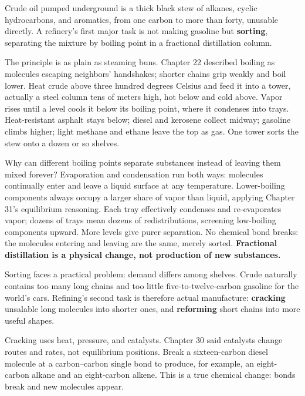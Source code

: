 Crude oil pumped underground is a thick black stew of alkanes, cyclic hydrocarbons, and aromatics, from one carbon to more than forty, unusable directly. A refinery's first major task is not making gasoline but \textbf{sorting}, separating the mixture by boiling point in a fractional distillation column.

The principle is as plain as steaming buns. Chapter 22 described boiling as molecules escaping neighbors' handshakes; shorter chains grip weakly and boil lower. Heat crude above three hundred degrees Celsius and feed it into a tower, actually a steel column tens of meters high, hot below and cold above. Vapor rises until a level cools it below its boiling point, where it condenses into trays. Heat-resistant asphalt stays below; diesel and kerosene collect midway; gasoline climbs higher; light methane and ethane leave the top as gas. One tower sorts the stew onto a dozen or so shelves.

\begin{qiaoliang}
Why can different boiling points separate substances instead of leaving them mixed forever? Evaporation and condensation run both ways: molecules continually enter and leave a liquid surface at any temperature. Lower-boiling components always occupy a larger share of vapor than liquid, applying Chapter 31's equilibrium reasoning. Each tray effectively condenses and re-evaporates vapor; dozens of trays mean dozens of redistributions, screening low-boiling components upward. More levels give purer separation. No chemical bond breaks: the molecules entering and leaving are the same, merely sorted. \textbf{Fractional distillation is a physical change, not production of new substances.}
\end{qiaoliang}

Sorting faces a practical problem: demand differs among shelves. Crude naturally contains too many long chains and too little five-to-twelve-carbon gasoline for the world's cars. Refining's second task is therefore actual manufacture: \textbf{cracking} unsalable long molecules into shorter ones, and \textbf{reforming} short chains into more useful shapes.

Cracking uses heat, pressure, and catalysts. Chapter 30 said catalysts change routes and rates, not equilibrium positions. Break a sixteen-carbon diesel molecule at a carbon--carbon single bond to produce, for example, an eight-carbon alkane and an eight-carbon alkene. This is a true chemical change: bonds break and new molecules appear.

